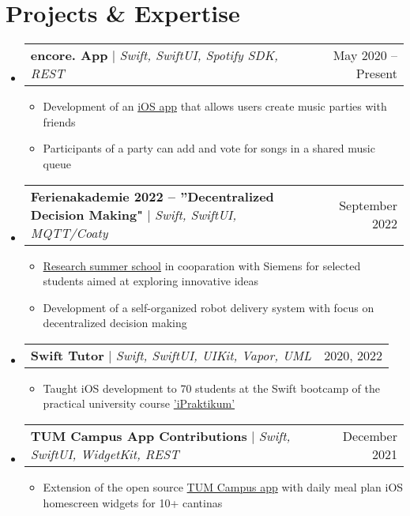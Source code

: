 \documentclass[letterpaper,11pt]{article}
\makeatletter
\newcommand{\resumeItem}[1]{
  \item\small{
    {#1 \vspace{-2pt}}
  }
}
\newcommand{\resumeProjectHeading}[2]{
    \item
    \begin{tabular*}{0.97\textwidth}{l@{\extracolsep{\fill}}r}
      \small#1 & #2 \\
    \end{tabular*}\vspace{-7pt}
}
\newcommand{\resumeSubHeadingListStart}{\begin{itemize}[leftmargin=0.15in, label={}]}
\newcommand{\resumeSubHeadingListEnd}{\end{itemize}}
\newcommand{\resumeItemListStart}{\begin{itemize}}
\newcommand{\resumeItemListEnd}{\end{itemize}\vspace{-5pt}}
\makeatother
\begin{document}
\section{Projects \& Expertise}
    \resumeSubHeadingListStart
    \resumeProjectHeading
          {\textbf{encore. App} $|$ \emph{Swift, SwiftUI, Spotify SDK, REST}}{May 2020 -- Present}
          \resumeItemListStart
            \resumeItem{Development of an \href{https://github.com/NikolaiMadlener/EncoreApp}{iOS app} that allows users create music parties with friends}
            \resumeItem{Participants of a party can add and vote for songs in a shared music queue}
          \resumeItemListEnd

    \resumeProjectHeading
      {\textbf{Ferienakademie 2022 -- ”Decentralized Decision Making"}  $|$ \emph{Swift, SwiftUI, MQTT/Coaty}}{September 2022}
      \resumeItemListStart
        \resumeItem{\href{https://ase.in.tum.de/lehrstuhl_1/projects/1193-ferienakademie-2022}{Research summer school} in cooparation with Siemens for selected students aimed at exploring innovative ideas}
        \resumeItem{Development of a self-organized robot delivery system with focus on decentralized decision making}
      \resumeItemListEnd

      \resumeProjectHeading
          {\textbf{Swift Tutor} $|$ \emph{Swift, SwiftUI, UIKit, Vapor, UML}}{2020, 2022}
          \resumeItemListStart
            \resumeItem{Taught iOS development to 70 students at the Swift bootcamp of the practical university course \href{https://ase.in.tum.de/lehrstuhl_1/teaching/159-teaching/wt2223/1201-ipraktikum-ws2223}{'iPraktikum'}}
          \resumeItemListEnd

      \resumeProjectHeading
          {\textbf{TUM Campus App Contributions} $|$ \emph{Swift, SwiftUI, WidgetKit, REST}}{December 2021}
          \resumeItemListStart
            \resumeItem{Extension of the open source \href{https://github.com/TUM-Dev/Campus-iOS}{TUM Campus app} with daily meal plan iOS homescreen widgets for 10+ cantinas}
          \resumeItemListEnd

    \resumeSubHeadingListEnd

\end{document}
